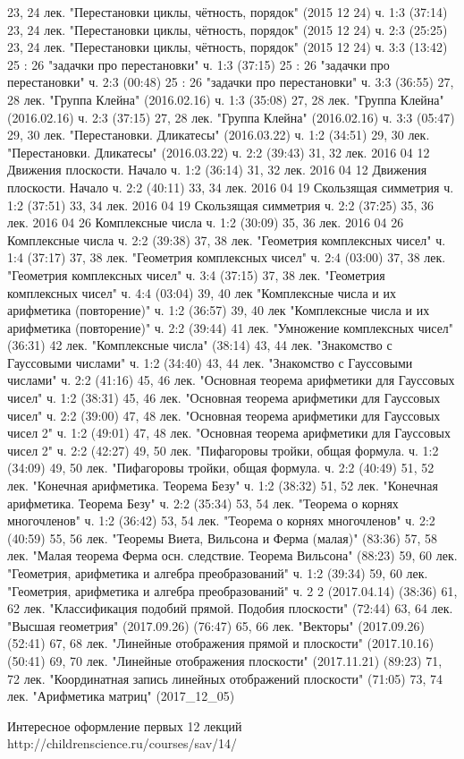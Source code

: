 23, 24 лек. "Перестановки циклы, чётность, порядок" (2015 12 24) ч. 1:3 (37:14)
23, 24 лек. "Перестановки циклы, чётность, порядок" (2015 12 24) ч. 2:3 (25:25)
23, 24 лек. "Перестановки циклы, чётность, порядок" (2015 12 24) ч. 3:3 (13:42)
25 : 26 "задачки про перестановки" ч. 1:3 (37:15)
25 : 26 "задачки про перестановки" ч. 2:3 (00:48)
25 : 26 "задачки про перестановки" ч. 3:3 (36:55)
27, 28 лек. "Группа Клейна" (2016.02.16) ч. 1:3 (35:08)
27, 28 лек. "Группа Клейна" (2016.02.16) ч. 2:3 (37:15)
27, 28 лек. "Группа Клейна" (2016.02.16) ч. 3:3 (05:47)
29, 30 лек. "Перестановки. Дликатесы" (2016.03.22) ч. 1:2 (34:51)
29, 30 лек. "Перестановки. Дликатесы" (2016.03.22) ч. 2:2 (39:43)
31, 32 лек. 2016 04 12 Движения плоскости. Начало ч. 1:2 (36:14)
31, 32 лек. 2016 04 12 Движения плоскости. Начало ч. 2:2 (40:11)
33, 34 лек. 2016 04 19 Скользящая симметрия ч. 1:2 (37:51)
33, 34 лек. 2016 04 19 Скользящая симметрия ч. 2:2 (37:25)
35, 36 лек. 2016 04 26 Комплексные числа ч. 1:2 (30:09)
35, 36 лек. 2016 04 26 Комплексные числа ч. 2:2 (39:38)
37, 38 лек. "Геометрия комплексных чисел" ч. 1:4 (37:17)
37, 38 лек. "Геометрия комплексных чисел" ч. 2:4 (03:00)
37, 38 лек. "Геометрия комплексных чисел" ч. 3:4 (37:15)
37, 38 лек. "Геометрия комплексных чисел" ч. 4:4 (03:04)
39, 40 лек "Комплексные числа и их арифметика (повторение)" ч. 1:2 (36:57)
39, 40 лек "Комплексные числа и их арифметика (повторение)" ч. 2:2 (39:44)
41 лек. "Умножение комплексных чисел" (36:31)
42 лек. "Комплексные числа" (38:14)
43, 44 лек. "Знакомство с Гауссовыми числами" ч. 1:2 (34:40)
43, 44 лек. "Знакомство с Гауссовыми числами" ч. 2:2 (41:16)
45, 46 лек. "Основная теорема арифметики для Гауссовых чисел" ч. 1:2 (38:31)
45, 46 лек. "Основная теорема арифметики для Гауссовых чисел" ч. 2:2 (39:00)
47, 48 лек. "Основная теорема арифметики для Гауссовых чисел 2" ч. 1:2 (49:01)
47, 48 лек. "Основная теорема арифметики для Гауссовых чисел 2" ч. 2:2 (42:27)
49, 50 лек. "Пифагоровы тройки, общая формула. ч. 1:2 (34:09)
49, 50 лек. "Пифагоровы тройки, общая формула. ч. 2:2 (40:49)
51, 52 лек. "Конечная арифметика. Теорема Безу" ч. 1:2 (38:32)
51, 52 лек. "Конечная арифметика. Теорема Безу" ч. 2:2 (35:34)
53, 54 лек. "Теорема о корнях многочленов" ч. 1:2 (36:42)
53, 54 лек. "Теорема о корнях многочленов" ч. 2:2 (40:59)
55, 56 лек. "Теоремы Виета, Вильсона и Ферма (малая)" (83:36)
57, 58 лек. "Малая теорема Ферма осн. следствие. Теорема Вильсона" (88:23)
59, 60 лек. "Геометрия, арифметика и алгебра преобразований" ч. 1:2 (39:34)
59, 60 лек. "Геометрия, арифметика и алгебра преобразований" ч. 2 2 (2017.04.14) (38:36)
61, 62 лек. "Классификация подобий прямой. Подобия плоскости" (72:44)
63, 64 лек. "Высшая геометрия" (2017.09.26) (76:47)
65, 66 лек. "Векторы" (2017.09.26) (52:41)
67, 68 лек. "Линейные отображения прямой и плоскости" (2017.10.16) (50:41)
69, 70 лек. "Линейные отображения плоскости" (2017.11.21) (89:23)
71, 72 лек. "Координатная запись линейных отображений плоскости" (71:05)
73, 74 лек. "Арифметика матриц" (2017_12_05)

Интересное оформление первых 12 лекций
http://childrenscience.ru/courses/sav/14/
